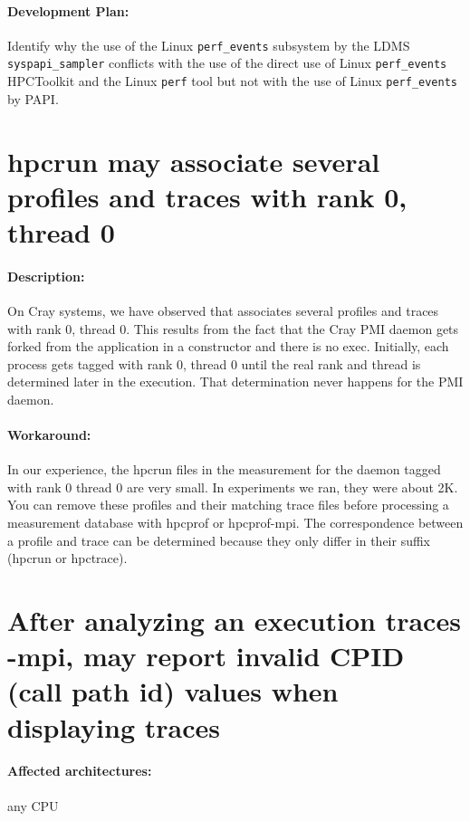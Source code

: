 \documentclass[11pt,twoside,letterpaper]{report}
\begin{document}
\paragraph{Development Plan:} Identify why the use of the Linux {\tt perf\_events} subsystem by the LDMS {\tt syspapi\_sampler} conflicts with the use of the direct use of Linux {\tt perf\_events} HPCToolkit and the Linux {\tt perf} tool but not with the use of Linux {\tt perf\_events} by PAPI.

\section{hpcrun{} may associate several profiles and traces with rank 0, thread 0}

\paragraph{Description:}  On Cray systems, we have observed that \hpcrun{} associates several profiles and traces with rank 0, thread 0. This results from the fact that the Cray PMI daemon gets forked from the application in a constructor and there is no exec. Initially, each process gets tagged with rank 0, thread 0 until the real rank and thread is determined later in the execution. That determination never happens for the PMI daemon.

\paragraph{Workaround:} In our experience, the hpcrun files in the measurement for the daemon tagged with rank 0 thread 0 are very small. In experiments we ran, they were about 2K. You can remove these profiles and their matching trace files before processing a measurement database with hpcprof or hpcprof-mpi. The correspondence between a profile and trace can be determined because they only differ in their suffix (hpcrun or hpctrace).

\section{After analyzing an execution traces  \hpcprof-mpi{}, \hpcviewer{} may report invalid CPID (call path id)
values when displaying traces}

\paragraph{Affected architectures:}  any CPU 
\end{document}
